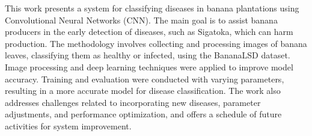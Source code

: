 This work presents a system for classifying diseases in banana plantations using Convolutional Neural Networks (CNN). The main goal is to assist banana producers in the early detection of diseases, such as Sigatoka, which can harm production. The methodology involves collecting and processing images of banana leaves, classifying them as healthy or infected, using the \ac{BananaLSD} dataset. Image processing and deep learning techniques were applied to improve model accuracy. Training and evaluation were conducted with varying parameters, resulting in a more accurate model for disease classification. The work also addresses challenges related to incorporating new diseases, parameter adjustments, and performance optimization, and offers a schedule of future activities for system improvement.


